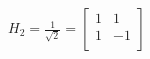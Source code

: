 \documentclass[preview]{standalone}
\begin{document}
\begin{align*}
H_2 = \frac{1}{\sqrt{2}} = \left[{\begin{array}{cc} 1 & 1 \\ 1 & -1 \\ \end{array}} \right]
\end{align*}
\end{document}
